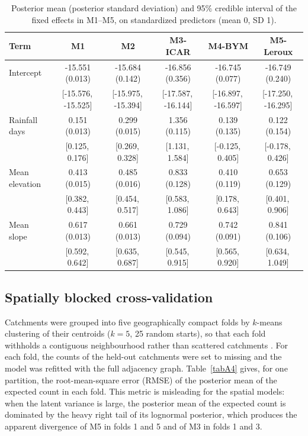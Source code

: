 \documentclass[journal abbreviation, manuscript]{copernicus}
\begin{document}
\begin{table}[h]
\caption{Posterior mean (posterior standard deviation) and 95\% credible interval of the fixed effects in M1--M5, on standardized predictors (mean 0, SD 1).}\label{tabA3}
\footnotesize
\begin{tabular}{@{}lccccc@{}}
\toprule
Term & M1 & M2 & M3-ICAR & M4-BYM & M5-Leroux \\
\midrule
Intercept & -15.551 (0.013) & -15.684 (0.142) & -16.856 (0.356) & -16.745 (0.077) & -16.749 (0.240) \\
 & [-15.576,\, -15.525] & [-15.975,\, -15.394] & [-17.587,\, -16.144] & [-16.897,\, -16.597] & [-17.250,\, -16.295] \\
Rainfall days & 0.151 (0.013) & 0.299 (0.015) & 1.356 (0.115) & 0.139 (0.135) & 0.122 (0.154) \\
 & [0.125,\, 0.176] & [0.269,\, 0.328] & [1.131,\, 1.584] & [-0.125,\, 0.405] & [-0.178,\, 0.426] \\
Mean elevation & 0.413 (0.015) & 0.485 (0.016) & 0.833 (0.128) & 0.410 (0.119) & 0.653 (0.129) \\
 & [0.382,\, 0.443] & [0.454,\, 0.517] & [0.583,\, 1.086] & [0.178,\, 0.643] & [0.401,\, 0.906] \\
Mean slope & 0.617 (0.013) & 0.661 (0.013) & 0.729 (0.094) & 0.742 (0.091) & 0.841 (0.106) \\
 & [0.592,\, 0.642] & [0.635,\, 0.687] & [0.545,\, 0.915] & [0.565,\, 0.920] & [0.634,\, 1.049] \\
\bottomrule
\end{tabular}
\end{table}

\subsection{Spatially blocked cross-validation}\label{secA4}

Catchments were grouped into five geographically compact folds by $k$-means clustering of their centroids ($k = 5$, 25 random starts), so that each fold withholds a contiguous neighbourhood rather than scattered catchments \citep{brenning2005spatial}. For each fold, the counts of the held-out catchments were set to missing and the model was refitted with the full adjacency graph. Table~\ref{tabA4} gives, for one partition, the root-mean-square error (RMSE) of the posterior mean of the expected count in each fold. This metric is misleading for the spatial models: when the latent variance is large, the posterior mean of the expected count is dominated by the heavy right tail of its lognormal posterior, which produces the apparent divergence of M5 in folds 1 and 5 and of M3 in folds 1 and 3.
\end{document}
